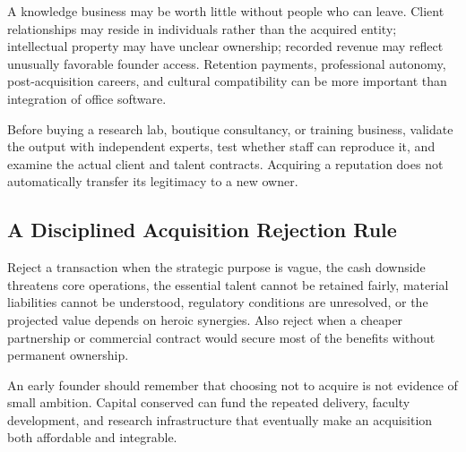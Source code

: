 A knowledge business may be worth little without people who can leave. Client relationships may reside in individuals rather than the acquired entity; intellectual property may have unclear ownership; recorded revenue may reflect unusually favorable founder access. Retention payments, professional autonomy, post-acquisition careers, and cultural compatibility can be more important than integration of office software.

Before buying a research lab, boutique consultancy, or training business, validate the output with independent experts, test whether staff can reproduce it, and examine the actual client and talent contracts. Acquiring a reputation does not automatically transfer its legitimacy to a new owner.

\subsection{A Disciplined Acquisition Rejection Rule}
\label{sec:disciplined_acquisition_rejection_rule}

Reject a transaction when the strategic purpose is vague, the cash downside threatens core operations, the essential talent cannot be retained fairly, material liabilities cannot be understood, regulatory conditions are unresolved, or the projected value depends on heroic synergies. Also reject when a cheaper partnership or commercial contract would secure most of the benefits without permanent ownership.

An early founder should remember that choosing not to acquire is not evidence of small ambition. Capital conserved can fund the repeated delivery, faculty development, and research infrastructure that eventually make an acquisition both affordable and integrable.
